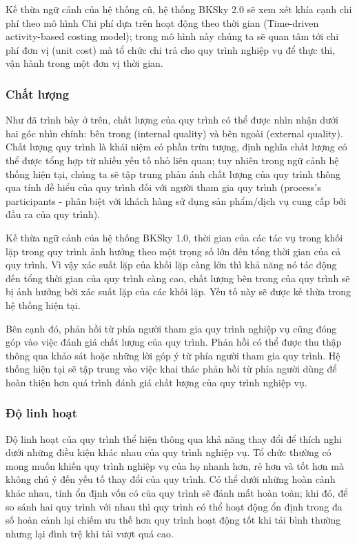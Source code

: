 Kế thừa ngữ cảnh của hệ thống cũ, hệ thống BKSky 2.0 sẽ xem xét khía cạnh chi
phí theo mô hình Chi phí dựa trên hoạt động theo thời gian (Time-driven
activity-based costing model); trong mô hình này chúng ta sẽ quan tâm tới chi
phí đơn vị (unit cost) mà tổ chức chi trả cho quy trình nghiệp vụ để thực thi,
vận hành trong một đơn vị thời gian.

\subsubsection{Chất lượng}

Như đã trình bày ở trên, chất lượng của quy trình có thể được nhìn nhận dưới hai góc nhìn chính: bên
trong (internal quality) và bên ngoài (external quality). Chất lượng quy trình
là khái niệm có phần trừu tượng, định nghĩa chất lượng có thể được tổng hợp từ
nhiều yếu tố nhỏ liên quan; tuy nhiên trong ngữ cảnh hệ thống hiện tại, chúng
ta sẽ tập trung phản ánh chất lượng của quy trình thông qua tính dễ hiểu của
quy trình đối với người tham gia quy trình (process's participants - phân biệt
với khách hàng sử dụng sản phẩm/dịch vụ cung cấp bởi đầu ra của quy trình).

Kế thừa ngữ cảnh của hệ thống BKSky 1.0, thời gian của các tác vụ trong khối
lặp trong quy trình ảnh hưởng theo một trọng số lớn đến tổng thời gian của cả
quy trình. Vì vậy xác suất lặp của khối lặp càng lớn thì khả năng nó tác động
đến tổng thời gian của quy trình càng cao, chất lượng bên trong của quy trình
sẽ bị ảnh hưởng bởi xác suất lặp của các khối lặp. Yếu tố này sẽ được kế thừa
trong hệ thống hiện tại.

Bên cạnh đó, phản hồi từ phía người tham gia quy trình nghiệp vụ cũng đóng góp
vào việc đánh giá chất lượng của quy trình. Phản hồi có thể được thu thập thông
qua khảo sát hoặc những lời góp ý từ phía người tham gia quy trình. Hệ thống
hiện tại sẽ tập trung vào việc khai thác phản hồi từ phía người dùng để hoàn
thiện hơn quá trình đánh giá chất lượng của quy trình nghiệp vụ.

\subsubsection{Độ linh hoạt}

Độ linh hoạt của quy trình thể hiện thông qua khả năng thay đổi để thích nghi dưới những điều kiện khác nhau của quy trình nghiệp vụ. Tổ chức thường có mong muốn khiến quy trình nghiệp vụ của họ nhanh hơn, rẻ hơn và tốt hơn mà không chú ý đến yếu tố thay đổi của quy trình. Có thể dưới những hoàn cảnh khác nhau, tính ổn định vốn có của quy trình sẽ đánh mất hoàn toàn; khi đó, để so sánh hai quy trình với nhau thì quy trình có thể hoạt động ổn định trong đa số hoàn cảnh lại chiếm ưu thế hơn quy trình hoạt động tốt khi tải bình thường nhưng lại đình trệ khi tải vượt quá cao.

